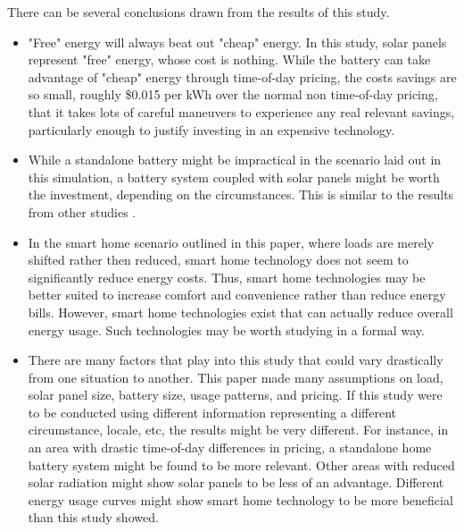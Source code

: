 There can be several conclusions drawn from the results of this study.

\begin{itemize}
    \item "Free" energy will always beat out "cheap" energy. In this study, solar panels represent "free" energy, whose cost is nothing. While the battery can take advantage of "cheap" energy through time-of-day pricing, the costs savings are so small, roughly \$0.015 per kWh over the normal non time-of-day pricing, that it takes lots of careful maneuvers to experience any real relevant savings, particularly enough to justify investing in an expensive technology.
    \item While a standalone battery might be impractical in the scenario laid out in this simulation, a battery system coupled with solar panels might be worth the investment, depending on the circumstances. This is similar to the results from other studies \cite{truong_economics_2016}.
    \item In the smart home scenario outlined in this paper, where loads are merely shifted rather then reduced, smart home technology does not seem to significantly reduce energy costs. Thus, smart home technologies may be better suited to increase comfort and convenience rather than reduce energy bills. However, smart home technologies exist that can actually reduce overall energy usage. Such technologies may be worth studying in a formal way.
    \item There are many factors that play into this study that could vary drastically from one situation to another. This paper made many assumptions on load, solar panel size, battery size, usage patterns, and pricing. If this study were to be conducted using different information representing a different circumstance, locale, etc, the results might be very different. For instance, in an area with drastic time-of-day differences in pricing, a standalone home battery system might be found to be more relevant. Other areas with reduced solar radiation might show solar panels to be less of an advantage. Different energy usage curves might show smart home technology to be more beneficial than this study showed.
\end{itemize}

